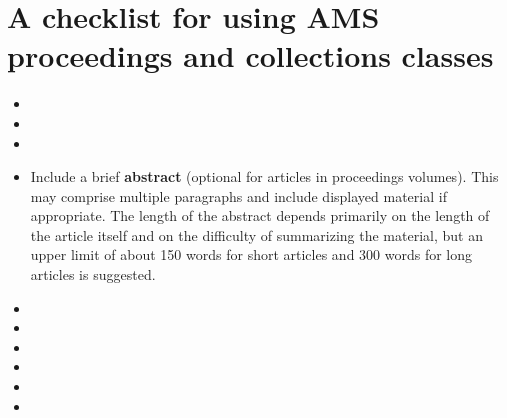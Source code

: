 
\section{A checklist for using AMS proceedings and collections classes}\label{sec:scheck}

\begin{itemize}

\item \the\AddHyperref
 
\item \the\ArticleTitleDesc

\item \the\ArticleTitleUC

\item Include a brief \textbf{abstract} (optional for articles in
 proceedings volumes).
 This may comprise multiple paragraphs
 and include displayed material if appropriate. The length of the
 abstract depends primarily on the length of the article itself and on the
 difficulty of summarizing the material, but an upper limit of about
 150 words for short articles and 300 words for long articles is suggested.

\item \the\GrantsThanks

\item \the\FirstPageFootnotes

\item \the\RunHeadJP
 
\item \the\BiblioInFile

\item \the\AcadAffil
  
\item \the\ConsentToPublish

\end{itemize}

\endinput

